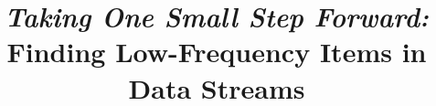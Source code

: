 \documentclass[conference]{IEEEtran}
\begin{document}
%
\title{\emph{Taking One Small Step Forward:}\\Finding Low-Frequency Items in Data Streams}




% 








\maketitle
\end{document}
